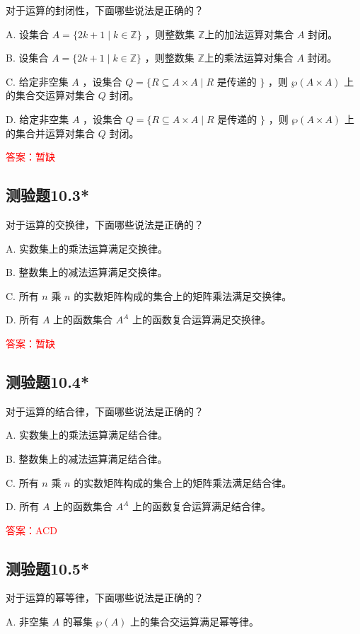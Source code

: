 \documentclass[UTF8, heading=true]{ctexart}
\begin{document}
对于运算的封闭性，下面哪些说法是正确的？

A. 设集合 $A=\{2 k+1 \mid k \in \mathbb{Z}\}$ ，则整数集 $\mathbb{Z} $上的加法运算对集合 $A$ 封闭。

B. 设集合 $A=\{2 k+1 \mid k \in \mathbb{Z}\}$ ，则整数集 $\mathbb{Z} $上的乘法运算对集合 $A$ 封闭。

C. 给定非空集 $A$ ，设集合 $Q=\{R \subseteq A \times A \mid R$ 是传递的 $\}$ ，则 $\wp(A \times A)$ 上的集合交运算对集合 $Q$ 封闭。

D. 给定非空集 $A$ ，设集合 $Q=\{R \subseteq A \times A \mid R$ 是传递的 $\}$ ，则 $\wp(A \times A)$ 上的集合并运算对集合 $Q$ 封闭。


\textcolor{red}{答案：暂缺}

\subsection{测验题10.3*}

对于运算的交换律，下面哪些说法是正确的？

A. 实数集上的乘法运算满足交换律。

B. 整数集上的减法运算满足交换律。

C. 所有 $n$ 乘 $n$ 的实数矩阵构成的集合上的矩阵乘法满足交换律。

D. 所有 $A$ 上的函数集合 $A^A$ 上的函数复合运算满足交换律。

\textcolor{red}{答案：暂缺}

\subsection{测验题10.4*}

对于运算的结合律，下面哪些说法是正确的？

A. 实数集上的乘法运算满足结合律。

B. 整数集上的减法运算满足结合律。

C. 所有 $n$ 乘 $n$ 的实数矩阵构成的集合上的矩阵乘法满足结合律。

D. 所有 $A$ 上的函数集合 $A^A$ 上的函数复合运算满足结合律。

\textcolor{red}{答案：ACD}

\subsection{测验题10.5*}

对于运算的幂等律，下面哪些说法是正确的？

A. 非空集 $A$ 的幂集 $\wp(A)$ 上的集合交运算满足幂等律。
\end{document}
